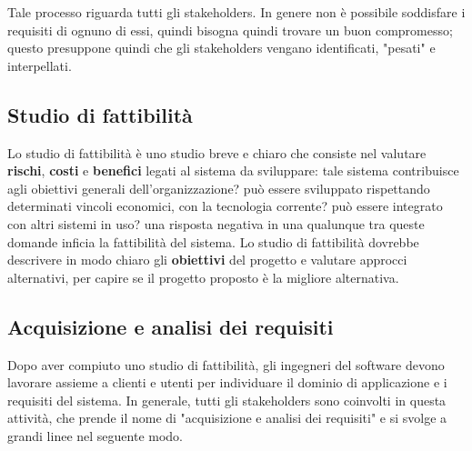 \documentclass[a4paper]{article}
\begin{document}
		
Tale processo riguarda tutti gli stakeholders. In genere non è possibile soddisfare i requisiti di ognuno di essi, quindi bisogna quindi trovare un buon compromesso; questo presuppone quindi che gli stakeholders vengano identificati, "pesati" e interpellati.

		
	\subsection{Studio di fattibilità}

		
Lo studio di fattibilità è uno studio breve e chiaro che consiste nel valutare \textbf{rischi}, \textbf{costi} e \textbf{benefici} legati al sistema da sviluppare: tale sistema contribuisce agli obiettivi generali dell'organizzazione? può essere sviluppato rispettando determinati vincoli economici, con la tecnologia corrente? può essere integrato con altri sistemi in uso? una risposta negativa in una qualunque tra queste domande inficia la fattibilità del sistema. Lo studio di fattibilità dovrebbe descrivere in modo chiaro gli \textbf{obiettivi} del progetto e valutare approcci alternativi, per capire se il progetto proposto è la migliore alternativa.

		
	\subsection{Acquisizione e analisi dei requisiti}

		
Dopo aver compiuto uno studio di fattibilità, gli ingegneri del software devono lavorare assieme a clienti e utenti per individuare il dominio di applicazione e i requisiti del sistema. In generale, tutti gli stakeholders sono coinvolti in questa attività, che prende il nome di "acquisizione e analisi dei requisiti" e si svolge a grandi linee nel seguente modo.
		
\end{document}
